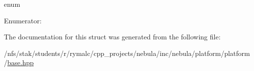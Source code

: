 enum \begin{Desc}
\item[Enumerator: ]\par
\begin{description}
\item[{\em 
\hypertarget{structnebula_1_1platform_1_1platform_1_1base_1_1event_a05ec8d48215a5f97993bdffbd62730c3ac51a57d4cb92b85020eb5d216e5ae017}{
eDELETE\_\-WINDOW}
\label{structnebula_1_1platform_1_1platform_1_1base_1_1event_a05ec8d48215a5f97993bdffbd62730c3ac51a57d4cb92b85020eb5d216e5ae017}
}]\end{description}
\end{Desc}



The documentation for this struct was generated from the following file:\begin{DoxyCompactItemize}
\item 
/nfs/stak/students/r/rymalc/cpp\_\-projects/nebula/inc/nebula/platform/platform/\hyperlink{inc_2nebula_2platform_2platform_2base_8hpp}{base.hpp}\end{DoxyCompactItemize}
